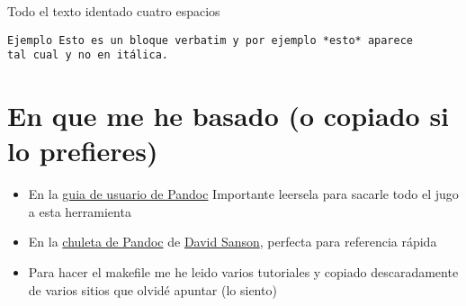 \documentclass[12pt,spanish,]{article}
\providecommand{\tightlist}{%
  \setlength{\itemsep}{0pt}\setlength{\parskip}{0pt}}
\begin{document}
Todo el texto identado cuatro espacios

\begin{verbatim}
Ejemplo Esto es un bloque verbatim y por ejemplo *esto* aparece
tal cual y no en itálica.
\end{verbatim}

\section{En que me he basado (o copiado si lo
prefieres)}\label{en-que-me-he-basado-o-copiado-si-lo-prefieres}

\begin{itemize}
\tightlist
\item
  En la \href{http://pandoc.org/README.html}{guia de usuario de Pandoc}
  Importante leersela para sacarle todo el jugo a esta herramienta
\item
  En la
  \href{https://github.com/dsanson/Pandoc.tmbundle/blob/master/Support/doc/cheatsheet.markdown}{chuleta
  de Pandoc} de \href{https://github.com/dsanson}{David Sanson},
  perfecta para referencia rápida
\item
  Para hacer el makefile me he leido varios tutoriales y copiado
  descaradamente de varios sitios que olvidé apuntar (lo siento)
\end{itemize}
\end{document}
